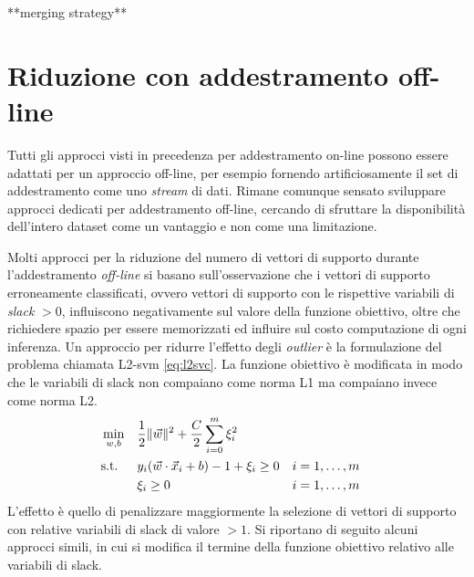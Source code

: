 **merging strategy**

%



\section{Riduzione con addestramento off-line}
Tutti gli approcci visti in precedenza per addestramento on-line possono essere adattati per un approccio off-line, per esempio fornendo artificiosamente il set di addestramento come uno \emph{stream} di dati. Rimane comunque sensato sviluppare approcci dedicati per addestramento off-line, cercando di sfruttare la disponibilità dell'intero dataset come un vantaggio e non come una limitazione.

Molti approcci per la riduzione del numero di vettori di supporto durante l'addestramento \emph{off-line} si basano sull'osservazione che i vettori di supporto erroneamente classificati, ovvero vettori di supporto con le rispettive variabili di \emph{slack} $>0$, influiscono negativamente sul valore della funzione obiettivo, oltre che richiedere spazio per essere memorizzati ed influire sul costo computazione di ogni inferenza. Un approccio per ridurre l'effetto degli \emph{outlier} è la formulazione del problema chiamata L2-svm \cref{eq:l2svc}. La funzione obiettivo è modificata in modo che le variabili di slack non compaiano come norma L1 ma compaiano invece come norma L2.
\begin{equation}
\label{eq:l2svc}
\begin{aligned}
& \min_{w,b}    && \frac{1}{2}\|\Vec{w}\|^2 + \frac{C}{2}\sum_{i=0}^{m} \xi_i^2 \\
& \textrm{s.t.} && y_i(\Vec{w}\cdot \Vec{x}_i + b) - 1 + \xi_i \geq 0 && i=1,\dots,m \\
&               && \xi_i \geq 0  && i=1,\dots,m 
\end{aligned}
\end{equation}
L'effetto è quello di penalizzare maggiormente la selezione di vettori di supporto con relative variabili di slack di valore $>1$.
Si riportano di seguito alcuni approcci simili, in cui si modifica il termine della funzione obiettivo relativo alle variabili di slack.


